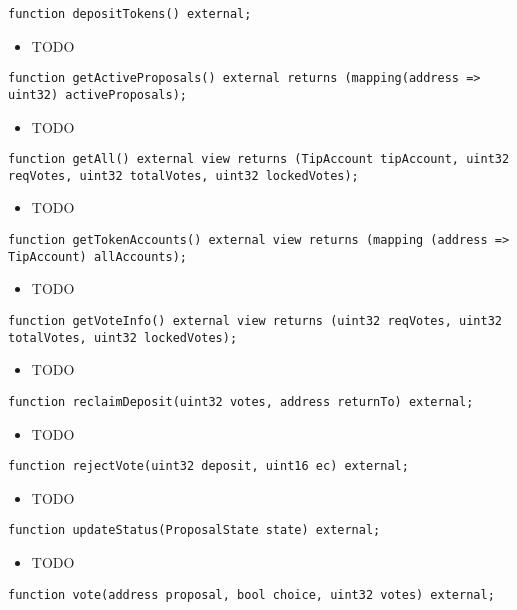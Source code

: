 \begin{lstlisting}[firstnumber=12]
    function depositTokens() external;
\end{lstlisting}
\begin{itemize}
\item TODO
\end{itemize}

\begin{lstlisting}[firstnumber=20]
    function getActiveProposals() external returns (mapping(address => uint32) activeProposals);
\end{lstlisting}
\begin{itemize}
\item TODO
\end{itemize}

\begin{lstlisting}[firstnumber=22]
    function getAll() external view returns (TipAccount tipAccount, uint32 reqVotes, uint32 totalVotes, uint32 lockedVotes);
\end{lstlisting}
\begin{itemize}
\item TODO
\end{itemize}

\begin{lstlisting}[firstnumber=19]
    function getTokenAccounts() external view returns (mapping (address => TipAccount) allAccounts);
\end{lstlisting}
\begin{itemize}
\item TODO
\end{itemize}

\begin{lstlisting}[firstnumber=18]
    function getVoteInfo() external view returns (uint32 reqVotes, uint32 totalVotes, uint32 lockedVotes);
\end{lstlisting}
\begin{itemize}
\item TODO
\end{itemize}

\begin{lstlisting}[firstnumber=13]
    function reclaimDeposit(uint32 votes, address returnTo) external;
\end{lstlisting}
\begin{itemize}
\item TODO
\end{itemize}

\begin{lstlisting}[firstnumber=15]
    function rejectVote(uint32 deposit, uint16 ec) external;
\end{lstlisting}
\begin{itemize}
\item TODO
\end{itemize}

\begin{lstlisting}[firstnumber=16]
    function updateStatus(ProposalState state) external;
\end{lstlisting}
\begin{itemize}
\item TODO
\end{itemize}

\begin{lstlisting}[firstnumber=11]
    function vote(address proposal, bool choice, uint32 votes) external;
\end{lstlisting}

